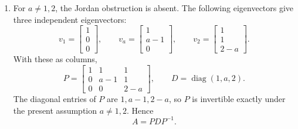 \documentclass[12pt]{article}
\newcommand{\diag}{\operatorname{diag}}
\begin{document}
\begin{enumerate}[label=(\alph*)]
  \item For $a\ne1,2$, the Jordan obstruction is absent. The following eigenvectors give three independent eigenvectors:
  \[
  v_1=\begin{bmatrix}1\\0\\0\end{bmatrix},
  \qquad
  v_a=\begin{bmatrix}1\\a-1\\0\end{bmatrix},
  \qquad
  v_2=\begin{bmatrix}1\\1\\2-a\end{bmatrix}.
  \]
  With these as columns,
  \[
  \boxed{
  P=\begin{bmatrix}
  1&1&1\\0&a-1&1\\0&0&2-a
  \end{bmatrix},
  \qquad
  D=\diag(1,a,2).}
  \]
  The diagonal entries of $P$ are $1,a-1,2-a$, so $P$ is invertible exactly under the present assumption $a\ne1,2$. Hence
  \[
  \boxed{A=PDP^{-1}.}
  \]
\end{enumerate}

\bigskip
\end{document}
